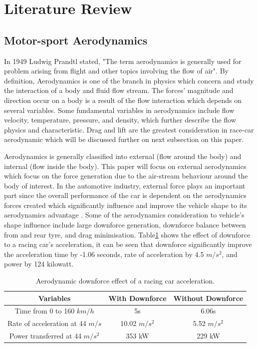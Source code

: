 \section{Literature Review}

\subsection{Motor-sport Aerodynamics}
In 1949 Ludwig Prandtl stated, "The term aerodynamics is generally used for problem arising from flight and other topics involving the flow of air\cite{Anderson2007FundamentalsJr.}". By definition, Aerodynamics is one of the branch in physics which concern and study the interaction of a body and fluid flow stream\cite{Scibor-Rylski1984RoadAerodynamics}. The forces' magnitude and direction occur on a body is a result of the flow interaction which depends on several variables. Some fundamental variables in aerodynamics include flow velocity, temperature, pressure, and density, which further describe the flow physics and characteristic. Drag and lift are the greatest consideration in race-car aerodynamic which will be discussed further on next subsection on this paper.

Aerodynamics is generally classified into external (flow around  the body) and internal (flow inside the body). This paper will focus on external aerodynamics which focus on the force generation due to the air-stream behaviour around the body of interest. In the automotive industry, external force plays an important part since the overall performance of the car is dependent on the aerodynamics forces created which significantly influence and improve the vehicle shape to its aerodynamics advantage \cite{Scibor-Rylski1984RoadAerodynamics}. Some of the aerodynamics consideration to vehicle's shape influence include large downforce generation, downforce balance between from and rear tyre, and drag minimisation. Table\ref{Table1} shows the effect of downforce to a racing car's acceleration, it can be seen that downforce significantly improve the acceleration time by -1.06 seconds, rate of acceleration by 4.5 $m/s^2$, and power by 124 kilowatt. 

\begin{table}[!ht]
\caption{\label{Table1} Aerodynamic downforce effect of a racing car acceleration\cite{Scibor-Rylski1984RoadAerodynamics}.}
\begin{center}
 \begin{tabular}{||c| c c ||} 
 \hline
 Variables & With Downforce & Without Downforce \\ [0.5ex] 
 \hline\hline
 Time from 0 to 160 $km/h$ & 5s & 6.06s \\ 
 \hline
 Rate of acceleration at 44 $m/s$ & 10.02 $m/s^{2}$ & 5.52 $m/s^2$ \\
 \hline
 Power transferred at 44 $m/s^2$ & 353 kW & 229 kW  \\
 \hline

\end{tabular}
\end{center}
\end{table}


